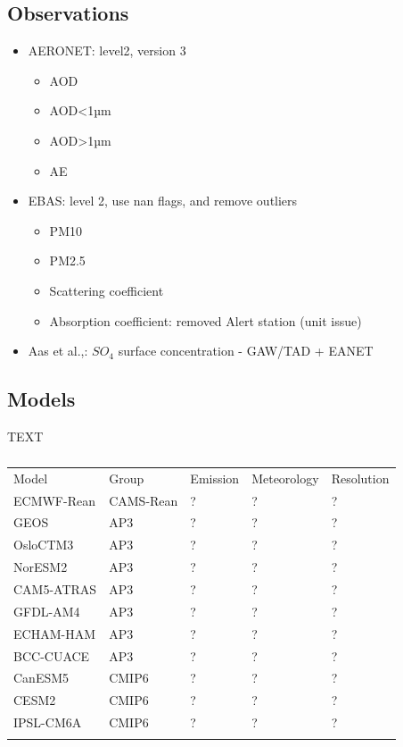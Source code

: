 \documentclass[journal abbreviation, manuscript]{copernicus}
\begin{document}
\subsection{Observations}
\begin{itemize}
 \item  AERONET: level2, version 3
       \begin{itemize}
        \item AOD
        \item AOD<1µm
        \item AOD>1µm
        \item AE
       \end{itemize}
 \item EBAS: level 2, use nan flags, and remove outliers
       \begin{itemize}
        \item PM10
        \item PM2.5
        \item Scattering coefficient
        \item Absorption coefficient: removed Alert station (unit issue)
       \end{itemize}
 \item Aas et al.,: $SO_{4}$ surface concentration - GAW/TAD + EANET
\end{itemize}

\subsection{Models}
TEXT

\begin{table}
 \begin{tabular}{lllll}
  \tophline
  Model      & Group     & Emission & Meteorology & Resolution \\
  \middlehline
  ECMWF-Rean & CAMS-Rean & ?        & ?           & ?          \\
  GEOS       & AP3       & ?        & ?           & ?          \\
  OsloCTM3   & AP3       & ?        & ?           & ?          \\
  NorESM2    & AP3       & ?        & ?           & ?          \\
  CAM5-ATRAS & AP3       & ?        & ?           & ?          \\
  GFDL-AM4   & AP3       & ?        & ?           & ?          \\
  ECHAM-HAM  & AP3       & ?        & ?           & ?          \\
  BCC-CUACE  & AP3       & ?        & ?           & ?          \\
  CanESM5    & CMIP6     & ?        & ?           & ?          \\
  CESM2      & CMIP6     & ?        & ?           & ?          \\
  IPSL-CM6A  & CMIP6     & ?        & ?           & ?          \\
  \bottomhline
 \end{tabular}
 \caption{}
 \label{models}
\end{table}
\end{document}
